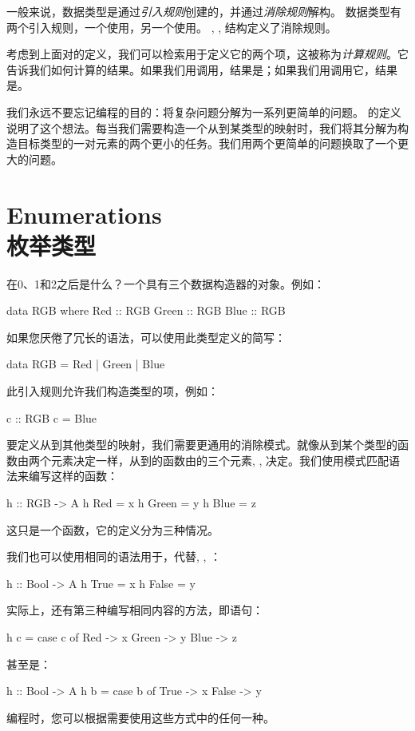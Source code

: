 \documentclass[DaoFP]{subfiles}
\begin{document}
 一般来说，数据类型是通过\emph{引入规则}创建的，并通过\emph{消除规则}解构。 数据类型有两个引入规则，一个使用，另一个使用。 , , 结构定义了消除规则。

 考虑到上面对的定义，我们可以检索用于定义它的两个项，这被称为\emph{计算规则}。它告诉我们如何计算的结果。如果我们用调用，结果是；如果我们用调用它，结果是。

 我们永远不要忘记编程的目的：将复杂问题分解为一系列更简单的问题。 的定义说明了这个想法。每当我们需要构造一个从到某类型的映射时，我们将其分解为构造目标类型的一对元素的两个更小的任务。我们用两个更简单的问题换取了一个更大的问题。

 \section{Enumerations\\枚举类型}

 在0、1和2之后是什么？一个具有三个数据构造器的对象。例如：
 \begin{haskell}
  data RGB where
  Red   :: RGB
  Green :: RGB
  Blue  :: RGB
 \end{haskell}
 如果您厌倦了冗长的语法，可以使用此类型定义的简写：

 \begin{haskell}
  data RGB = Red | Green | Blue
 \end{haskell}
 此引入规则允许我们构造类型的项，例如：
 \begin{haskell}
  c :: RGB
  c = Blue
 \end{haskell}
 要定义从到其他类型的映射，我们需要更通用的消除模式。就像从到某个类型的函数由两个元素决定一样，从到的函数由的三个元素, , 决定。我们使用模式匹配语法来编写这样的函数：
 \begin{haskell}
  h :: RGB -> A
  h Red   = x
  h Green = y
  h Blue  = z
 \end{haskell}
 这只是一个函数，它的定义分为三种情况。

 我们也可以使用相同的语法用于，代替, , ：
 \begin{haskell}
  h :: Bool -> A
  h True  = x
  h False = y
 \end{haskell}
 实际上，还有第三种编写相同内容的方法，即语句：
 \begin{haskell}
  h c = case c of
  Red   -> x
  Green -> y
  Blue  -> z
 \end{haskell}
 甚至是：
 \begin{haskell}
  h :: Bool -> A
  h b = case b of
  True  -> x
  False -> y
 \end{haskell}
 编程时，您可以根据需要使用这些方式中的任何一种。
\end{document}
